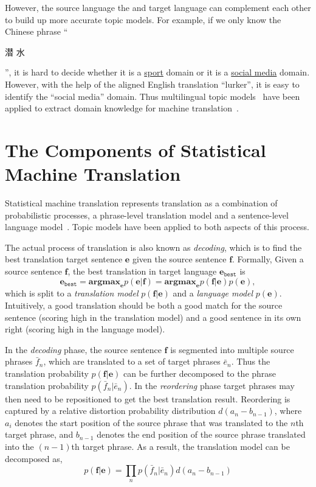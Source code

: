 However, the source language the and target language can complement
each other to build up more accurate topic models. For example, if we
only know the Chinese phrase ``\begin{CJK*}{UTF8}{gbsn}潜
  水\end{CJK*}'', it is hard to decide whether it is a
  \underline{sport} domain or it is a \underline{social media}
  domain. However, with the help of the aligned English translation
  ``lurker'', it is easy to identify the ``social media'' domain. Thus
  multilingual topic models~\citep{ni-09,DeSmet-09,mimno-09,boyd-graber-10} have been
  applied to extract domain knowledge for machine
  translation~\citep{hu-14}.

\section{The Components of Statistical Machine Translation}

Statistical machine translation represents translation as a
combination of probabilistic processes, a phrase-level translation model and a sentence-level language model~\citep{koehn-03,koehn-09}. 
Topic models have been applied to both aspects of this process.

The actual process of translation is also known as \textit{decoding},
which is to find the best translation target sentence $\mathbf{e}$ 
given the source sentence $\mathbf{f}$. Formally,
Given a source sentence $\mathbf{f}$, the best
translation in target language $\mathbf{e}_\texttt{best}$ is
\begin{equation}
\mathbf{e}_\texttt{best} = \textbf{argmax}_\mathbf{e} p(\mathbf{e}|\mathbf{f}) = \textbf{argmax}_\mathbf{e} p(\mathbf{f}|\mathbf{e}) p (\mathbf{e}),
\end{equation}
which is split to a \textit{translation model}
$p(\mathbf{f}|\mathbf{e})$ and a \textit{language model} $p
(\mathbf{e})$.
Intuitively, a good translation should be both a good match for the source sentence (scoring high in the translation model) 
and a good sentence in its own right (scoring high in the language model).

In the \textit{decoding} phase, the source sentence $\mathbf{f}$ is segmented into multiple source
phrases $\bar{f}_n$, which are translated to a set
of target phrases $\bar{e}_n$. Thus the translation probability
$p(\mathbf{f}|\mathbf{e})$ can be further decomposed to the phrase
translation probability $p(\bar{f}_n | \bar{e}_n)$.
In the \textit{reordering} phase target phrases may then need to be repositioned to get the best
translation result. Reordering is captured by a relative distortion
probability distribution $d(a_n - b_{n-1})$, where $a_i$ denotes the
start position of the source phrase that was translated to the $n$th
target phrase, and $b_{n-1}$ denotes the end position of the source
phrase translated into the $(n-1)$th target phrase. As a result, the
translation model can be decomposed as,
\begin{equation}
p(\mathbf{f}|\mathbf{e}) = \prod_{n} p(\bar{f}_n | \bar{e}_n) d(a_n - b_{n-1})
\end{equation}

